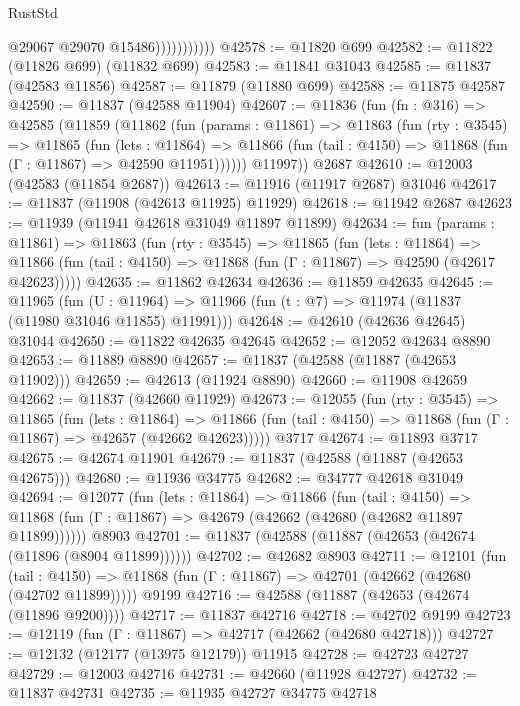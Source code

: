 \begin{lexlean}{RustStd}
\begin{coremodule}
{\begin{coremodule}
{{{{{{{{{{{{{{{{{{{{{{{{{{{{{{{{{{{{{{{{{{{{{{{{{{                          @29067
                          @29070
                          @15486)))))))))))
@42578 := @11820 @699
@42582 := @11822 (@11826 @699) (@11832 @699)
@42583 := @11841 @31043
@42585 := @11837 (@42583 @11856)
@42587 := @11879 (@11880 @699)
@42588 := @11875 @42587
@42590 := @11837 (@42588 @11904)
@42607 := @11836
    (fun (fn : @316) =>
    @42585
      (@11859
        (@11862
          (fun (params : @11861) =>
          @11863
            (fun (rty : @3545) =>
            @11865
              (fun (lets : @11864) =>
              @11866 (fun (tail : @4150) => @11868 (fun (Γ : @11867) => @42590 @11951))))))
        @11997))
    @2687
@42610 := @12003 (@42583 (@11854 @2687))
@42613 := @11916 (@11917 @2687) @31046
@42617 := @11837 (@11908 (@42613 @11925) @11929)
@42618 := @11942 @2687
@42623 := @11939 (@11941 @42618 @31049 @11897 @11899)
@42634 := fun (params : @11861) =>
  @11863
    (fun (rty : @3545) =>
    @11865
      (fun (lets : @11864) =>
      @11866 (fun (tail : @4150) => @11868 (fun (Γ : @11867) => @42590 (@42617 @42623)))))
@42635 := @11862 @42634
@42636 := @11859 @42635
@42645 := @11965
    (fun (U : @11964) => @11966 (fun (t : @7) => @11974 (@11837 (@11980 @31046 @11855) @11991)))
@42648 := @42610 (@42636 @42645) @31044
@42650 := @11822 @42635 @42645
@42652 := @12052 @42634 @8890
@42653 := @11889 @8890
@42657 := @11837 (@42588 (@11887 (@42653 @11902)))
@42659 := @42613 (@11924 @8890)
@42660 := @11908 @42659
@42662 := @11837 (@42660 @11929)
@42673 := @12055
    (fun (rty : @3545) =>
    @11865
      (fun (lets : @11864) =>
      @11866 (fun (tail : @4150) => @11868 (fun (Γ : @11867) => @42657 (@42662 @42623)))))
    @3717
@42674 := @11893 @3717
@42675 := @42674 @11901
@42679 := @11837 (@42588 (@11887 (@42653 @42675)))
@42680 := @11936 @34775
@42682 := @34777 @42618 @31049
@42694 := @12077
    (fun (lets : @11864) =>
    @11866
      (fun (tail : @4150) =>
      @11868 (fun (Γ : @11867) => @42679 (@42662 (@42680 (@42682 @11897 @11899))))))
    @8903
@42701 := @11837 (@42588 (@11887 (@42653 (@42674 (@11896 (@8904 @11899))))))
@42702 := @42682 @8903
@42711 := @12101
    (fun (tail : @4150) => @11868 (fun (Γ : @11867) => @42701 (@42662 (@42680 (@42702 @11899)))))
    @9199
@42716 := @42588 (@11887 (@42653 (@42674 (@11896 @9200))))
@42717 := @11837 @42716
@42718 := @42702 @9199
@42723 := @12119 (fun (Γ : @11867) => @42717 (@42662 (@42680 @42718)))
@42727 := @12132 (@12177 (@13975 @12179)) @11915
@42728 := @42723 @42727
@42729 := @12003 @42716
@42731 := @42660 (@11928 @42727)
@42732 := @11837 @42731
@42735 := @11935 @42727 @34775 @42718
}}}}}}}}}}}}}}}}}}}}}}}}}}}}}}}}}}}}}}}}}}}}}}}}}}
\end{coremodule}}
\end{coremodule}
\end{lexlean}
